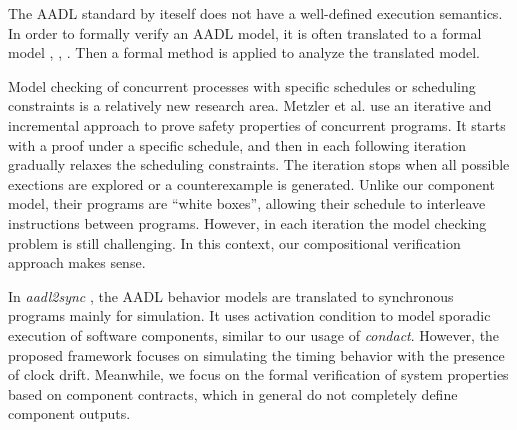 The AADL standard by iteself does not have a well-defined execution semantics. In order to formally verify an AADL model, it is often translated to a formal model \cite{AADL2TASM}, \cite{AADL2Sync}, \cite{AADL2TLA} \cite{AADS} \cite{AADL2BIP}. Then a formal method is applied to analyze the translated model.

Model checking of concurrent processes with specific schedules or scheduling constraints is a relatively new research area. Metzler et al. \cite{Metzler2020} use an iterative and incremental approach to prove safety properties of concurrent programs. It starts with a proof under a specific schedule, and then in each following iteration gradually relaxes the scheduling constraints. The iteration stops when all possible exections are explored or a counterexample is generated. Unlike our component model, their programs are ``white boxes'', allowing their schedule to interleave instructions between programs. However, in each iteration the model checking problem is 
still challenging. In this context, our compositional verification approach makes sense.

In \emph{aadl2sync} \cite{AADL2Sync}, the AADL behavior models are translated to synchronous programs mainly for simulation. It uses activation condition to model sporadic execution of software components, similar to our usage of \emph{condact}. However, the proposed framework focuses on simulating the timing behavior with the presence of clock drift. Meanwhile, we focus on the formal verification of system properties based on component contracts, which in general do not completely define component outputs.

